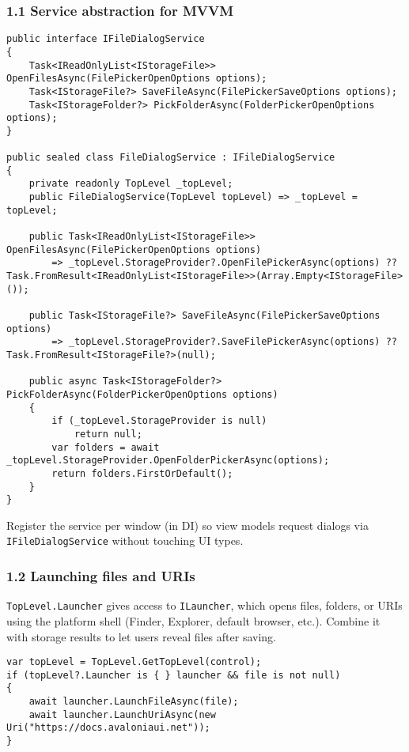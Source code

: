 \subsubsection{1.1 Service abstraction for
MVVM}\label{service-abstraction-for-mvvm}

\begin{lstlisting}
public interface IFileDialogService
{
    Task<IReadOnlyList<IStorageFile>> OpenFilesAsync(FilePickerOpenOptions options);
    Task<IStorageFile?> SaveFileAsync(FilePickerSaveOptions options);
    Task<IStorageFolder?> PickFolderAsync(FolderPickerOpenOptions options);
}

public sealed class FileDialogService : IFileDialogService
{
    private readonly TopLevel _topLevel;
    public FileDialogService(TopLevel topLevel) => _topLevel = topLevel;

    public Task<IReadOnlyList<IStorageFile>> OpenFilesAsync(FilePickerOpenOptions options)
        => _topLevel.StorageProvider?.OpenFilePickerAsync(options) ?? Task.FromResult<IReadOnlyList<IStorageFile>>(Array.Empty<IStorageFile>());

    public Task<IStorageFile?> SaveFileAsync(FilePickerSaveOptions options)
        => _topLevel.StorageProvider?.SaveFilePickerAsync(options) ?? Task.FromResult<IStorageFile?>(null);

    public async Task<IStorageFolder?> PickFolderAsync(FolderPickerOpenOptions options)
    {
        if (_topLevel.StorageProvider is null)
            return null;
        var folders = await _topLevel.StorageProvider.OpenFolderPickerAsync(options);
        return folders.FirstOrDefault();
    }
}
\end{lstlisting}

Register the service per window (in DI) so view models request dialogs
via \passthrough{\lstinline!IFileDialogService!} without touching UI
types.

\subsubsection{1.2 Launching files and
URIs}\label{launching-files-and-uris}

\passthrough{\lstinline!TopLevel.Launcher!} gives access to
\passthrough{\lstinline!ILauncher!}, which opens files, folders, or URIs
using the platform shell (Finder, Explorer, default browser, etc.).
Combine it with storage results to let users reveal files after saving.

\begin{lstlisting}
var topLevel = TopLevel.GetTopLevel(control);
if (topLevel?.Launcher is { } launcher && file is not null)
{
    await launcher.LaunchFileAsync(file);
    await launcher.LaunchUriAsync(new Uri("https://docs.avaloniaui.net"));
}
\end{lstlisting}

